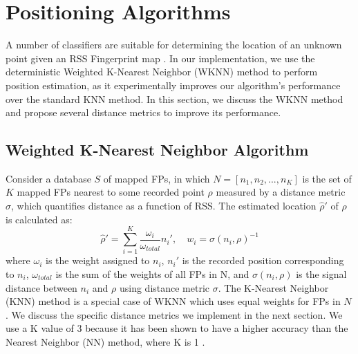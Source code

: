 \documentclass[conference]{IEEEtran}
\begin{document}
\begin{table}[!t]
\renewcommand{\arraystretch}{1.3}
\caption{MAC Coverage by Scan Numbers}
\label{tab:MAC_accuracy}
\centering
{}
\end{table}

\section{Positioning Algorithms}
A number of classifiers are suitable for determining the location of an unknown point given an RSS Fingerprint map \cite{Sayad2}\cite{Chaudhuri}. In our implementation, we use the deterministic Weighted K-Nearest Neighbor (WKNN) method to perform position estimation, as it experimentally improves our algorithm's performance over the standard KNN method. In this section, we discuss the WKNN method and propose several distance metrics to improve its performance. 
\subsection{Weighted K-Nearest Neighbor Algorithm}
\indent Consider a database $S$ of mapped FPs, in which $N=[n_1, n_2, ..., n_K]$ is the set of $K$ mapped FPs nearest to some recorded point $\rho$ measured by a distance metric $\sigma$, which quantifies distance as a function of RSS. The estimated location $\hat{\rho}'$ of $\rho$ is calculated as:
\begin{equation}
\label{eq:wknn}
\hat{\rho}' = \sum\limits_{i=1}^{K}\frac{\omega_i}{\omega_{total}}n_i', \quad w_i = \sigma(n_i, \rho)^{-1}
\end{equation}
where $\omega_i$ is the weight assigned to $n_i$, $n_i'$ is the recorded position corresponding to $n_i$, $\omega_{total}$ is the sum of the weights of all FPs in N, and $\sigma(n_i, \rho)$ is the signal distance between $n_i$ and $\rho$ using distance metric $\sigma$. The K-Nearest Neighbor (KNN) method is a special case of WKNN which uses equal weights for FPs in $N$. We discuss the specific distance metrics we implement in the next section. We use a K value of 3 because it has been shown to have a higher accuracy than the Nearest Neighbor (NN) method, where K is 1 \cite{Kokkinis}. 
\end{document}
